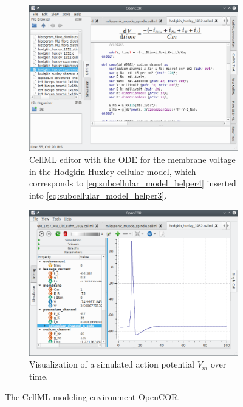 \begin{figure}%
  \centering%
  \begin{subfigure}[t]{0.45\textwidth}%
    \centering%
    \includegraphics[width=\textwidth]{images/implementation/opencor1.png}
    \caption{CellML editor with the ODE for the membrane voltage  in the Hodgkin-Huxley cellular model, which corresponds to \cref{eq:subcellular_model_helper4} inserted into \cref{eq:subcellular_model_helper3}.}%
    \label{fig:opencor1}%
  \end{subfigure}
  \quad
  \begin{subfigure}[t]{0.45\textwidth}%
    \centering%
    \includegraphics[width=\textwidth]{images/implementation/opencor2.png}
    \caption{Visualization of a simulated action potential $V_m$ over time.}%
    \label{fig:opencor2}%
  \end{subfigure}
  \caption{The CellML modeling environment OpenCOR.}%
  \label{fig:opencor}%
\end{figure}%

